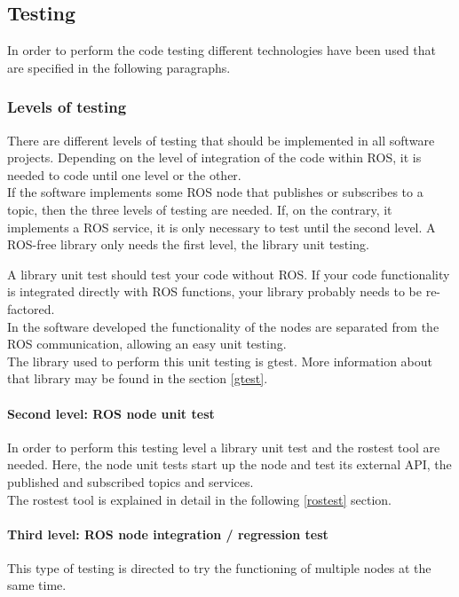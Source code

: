 \subsection{Testing}
\label{testing}
In order to perform the code testing different technologies have been used that are specified in the following paragraphs. 
\\


\subsubsection {Levels of testing}

There are different levels of testing that should be implemented in all software projects. Depending on the level of integration of the code within ROS, it is needed to code until one level or the other. 		\\

If the software implements some ROS node that publishes or subscribes to a topic, then the three levels of testing are needed. If, on the contrary, it implements a ROS service, it is only necessary to test until the second level. A ROS-free library only needs the first level, the library unit testing. 

A library unit test should test your code without ROS. If your code functionality is integrated directly with ROS functions, your library probably needs to be re-factored. 
\\

In the software developed the functionality of the nodes are separated from the ROS communication, allowing an easy unit testing. \\

The library used to perform this unit testing is gtest. More information about that library may be found in the section \ref{gtest}.

	\paragraph{Second level: ROS node unit test}
In order to perform this testing level a library unit test and the rostest tool are needed. Here, the node unit tests start up the node and test its external API, the published and subscribed topics and services. 
\\

The rostest tool is explained in detail in the following \ref{rostest} section.

	\paragraph{Third level: ROS node integration / regression test}
	This type of testing is directed to try the functioning of multiple nodes at the same time. \\

